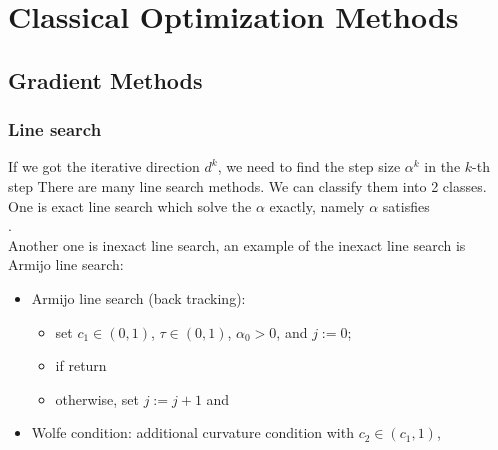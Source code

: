 \section{Classical Optimization Methods}
\iffalse
	\begin{center}
		\huge\color{blue}\bf
		Section 2. Classical Optimization Methods
	\end{center}
\fi
\subsection{Gradient Methods}
	\subsubsection{Line search}
	If we got the iterative direction $d^k$, we need to find the step size $\alpha^k$ in the $k$-th step 
	There are many line search methods. We can classify them into 2 classes. \\
	One is exact line search which solve the $\alpha$ exactly, namely $\alpha$ satisfies\\
	 .\\
	Another one is inexact line search, an example of the inexact line search is Armijo line search:
	\begin{itemize}
		\item Armijo line search (back tracking):
		\begin{itemize}
			\item set $c_1\in(0,1)$, $\tau\in(0,1)$, $\alpha_0>0$, and $j:=0$;\\[1mm]
			\item if  return
			\\[1mm]
			\item otherwise, set $j:=j+1$ and 
		\end{itemize}
		\item Wolfe condition: {\small additional curvature condition with $c_2\in (c_1,1)$,}
		\vspace{-1mm}
	\end{itemize}

